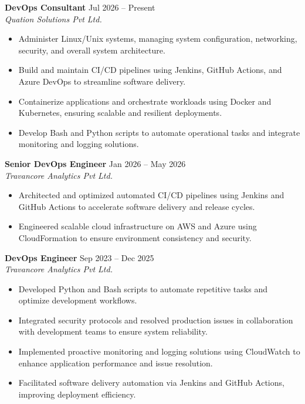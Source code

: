 \documentclass[a4paper,11pt]{article}
\begin{document}
\textbf{DevOps Consultant} \hfill Jul 2026 – Present \\
\textit{Quation Solutions Pvt Ltd.} \hfill
\begin{itemize}[nosep, leftmargin=0.2in]
    \item Administer Linux/Unix systems, managing system configuration, networking, security, and overall system architecture.
    \item Build and maintain CI/CD pipelines using Jenkins, GitHub Actions, and Azure DevOps to streamline software delivery.
    \item Containerize applications and orchestrate workloads using Docker and Kubernetes, ensuring scalable and resilient deployments.
    \item Develop Bash and Python scripts to automate operational tasks and integrate monitoring and logging solutions.
\end{itemize}

\vspace{5pt}

\textbf{Senior DevOps Engineer} \hfill Jan 2026 – May 2026 \\
\textit{Travancore Analytics Pvt Ltd.} \hfill
\begin{itemize}[nosep, leftmargin=0.2in]
    \item Architected and optimized automated CI/CD pipelines using Jenkins and GitHub Actions to accelerate software delivery and release cycles.
    \item Engineered scalable cloud infrastructure on AWS and Azure using CloudFormation to ensure environment consistency and security.
\end{itemize}

\vspace{5pt}

\textbf{DevOps Engineer} \hfill Sep 2023 – Dec 2025 \\
\textit{Travancore Analytics Pvt Ltd.} \hfill
\begin{itemize}[nosep, leftmargin=0.2in]
    \item Developed Python and Bash scripts to automate repetitive tasks and optimize development workflows.
    \item Integrated security protocols and resolved production issues in collaboration with development teams to ensure system reliability.
    \item Implemented proactive monitoring and logging solutions using CloudWatch to enhance application performance and issue resolution.
    \item Facilitated software delivery automation via Jenkins and GitHub Actions, improving deployment efficiency.
\end{itemize}
\end{document}
